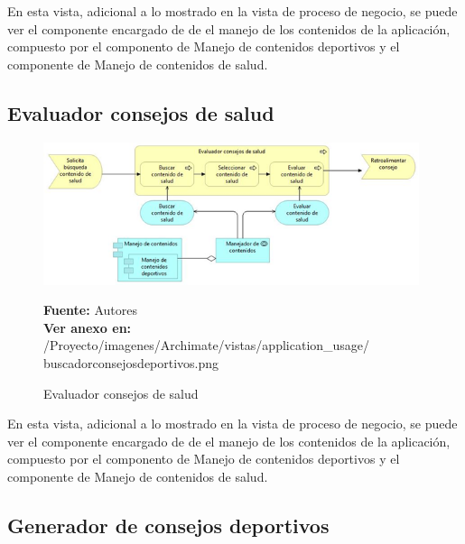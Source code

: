 En esta vista, adicional a lo mostrado en la vista de proceso de negocio, se puede ver el componente encargado de de el manejo de los contenidos de la aplicación, compuesto por el componento de Manejo de contenidos deportivos y el componente de Manejo de contenidos de salud.

\subsection{Evaluador consejos de salud}

\begin{figure}[!htb]
  \begin{center}
    \includegraphics[width=11cm]{./imagenes/Archimate/vistas/application_usage/evaluadorconsejossalud.png}
    \caption{Evaluador consejos de salud}
    \label{fig:BP_EvaluadorConsejosSalud}
    \textbf{Fuente:}  Autores \\
    \textbf{Ver anexo en:} /Proyecto/imagenes/Archimate/vistas/application\_usage/
    buscadorconsejosdeportivos.png
  \end{center}
\end{figure}

En esta vista, adicional a lo mostrado en la vista de proceso de negocio, se puede ver el componente encargado de de el manejo de los contenidos de la aplicación, compuesto por el componento de Manejo de contenidos deportivos y el componente de Manejo de contenidos de salud.

\subsection{Generador de consejos deportivos}

